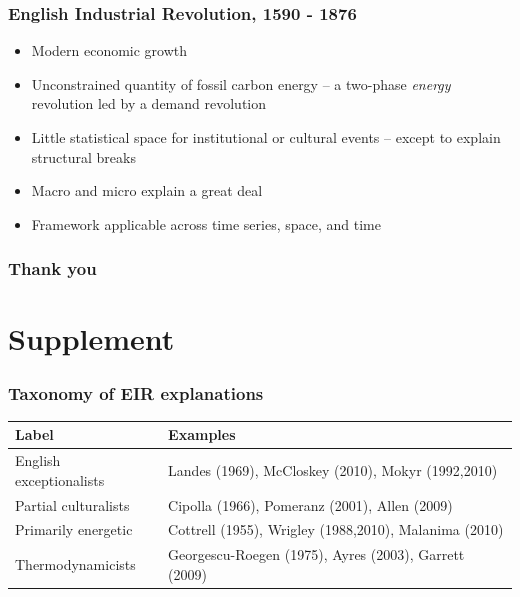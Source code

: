 \documentclass[final]{beamer}
\begin{document}
\begin{frame}
\frametitle{English Industrial Revolution, 1590 - 1876}

	\begin{itemize}
	\item Modern economic growth
	\item Unconstrained quantity of fossil carbon energy -- a two-phase \textit{energy} revolution led by a demand revolution
	\item Little statistical space for institutional or cultural events -- except to explain structural breaks
	\item Macro and micro explain a great deal
	\item Framework applicable across time series, space, and time
	\end{itemize}
\end{frame}

\begin{frame}
\frametitle{Thank you}
\end{frame}

\section{Supplement}


\begin{frame}
\frametitle{Taxonomy of EIR explanations}
\footnotesize{
\begin{table}[p!]
\label{tbl:taxonomy}
\begin{tabular}{ll}
Label&Examples\\
\hline \hline
English exceptionalists&Landes (1969), McCloskey (2010), Mokyr (1992,2010)\\
Partial culturalists&Cipolla (1966), Pomeranz (2001), Allen (2009)\\
Primarily energetic&Cottrell (1955), Wrigley (1988,2010), Malanima (2010)\\
Thermodynamicists&Georgescu-Roegen (1975), Ayres (2003), Garrett (2009)\\
\end{tabular}
\end{table}
}
\end{frame}
\end{document}
